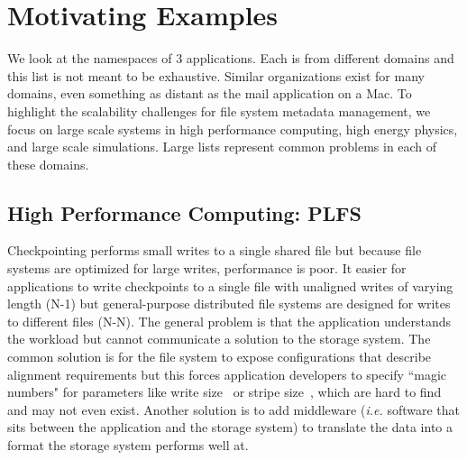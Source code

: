 \section{Motivating Examples}
\label{sec:motivating-examples}

We look at the namespaces of 3 applications.  Each is from different domains
and this list is not meant to be exhaustive. Similar organizations exist for
many domains, even something as distant as the mail application on a Mac. To
highlight the scalability challenges for file system metadata management, we
focus on large scale systems in high performance computing, high energy
physics, and large scale simulations. Large lists represent common problems in
each of these domains.


\subsection{High Performance Computing: PLFS}
\label{sec:plfs}

Checkpointing performs small writes to a single shared file but because file
systems are optimized for large writes, performance is poor.  It easier for
applications to write checkpoints to a single file with unaligned writes of
varying length (N-1) but general-purpose distributed file systems are designed
for writes to different files (N-N).  The general problem is that the
application understands the workload but cannot communicate a solution to the
storage system. The common solution is for the file system to expose
configurations that describe alignment requirements but this forces application
developers to specify ``magic numbers" for parameters like write
size~\cite{bent_plfs_2009} or stripe size~\cite{behzad:sc2013-autotuning},
which are hard to find and may not even exist.  Another solution is to add
middleware ({\it i.e.} software that sits between the application and the
storage system) to translate the data into a format the storage system performs
well at. 

